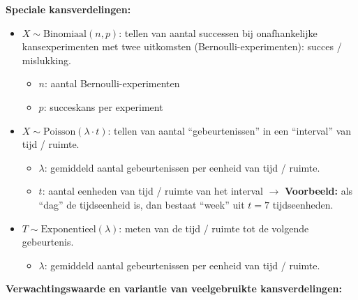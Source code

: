 \documentclass[11pt,a4paper,dutch]{article} %
\begin{document}
\textbf{Speciale kansverdelingen:}
\begin{itemize}
    \item $X \sim \text{Binomiaal}(n, p)$: tellen van aantal successen bij onafhankelijke kansexperimenten met twee uitkomsten (Bernoulli-experimenten): succes / mislukking.
    \begin{itemize}
        \item $n$: aantal Bernoulli-experimenten
        \item $p$: succeskans per experiment
    \end{itemize}
    \item $X \sim \text{Poisson}(\lambda \cdot t)$: tellen van aantal ``gebeurtenissen'' in een ``interval'' van tijd / ruimte.
    \begin{itemize}
        \item $\lambda$: gemiddeld aantal gebeurtenissen per eenheid van tijd / ruimte.  
        \item $t$: aantal eenheden van tijd / ruimte van het interval
        $\rightarrow$ \textbf{Voorbeeld:} als ``dag'' de tijdseenheid is, dan bestaat ``week'' uit $t=7$ tijdseenheden. 
    \end{itemize}
    \item $T \sim \text{Exponentieel}(\lambda)$: meten van de tijd / ruimte tot de volgende gebeurtenis.
    \begin{itemize}
        \item $\lambda$: gemiddeld aantal gebeurtenissen per eenheid van tijd / ruimte.  
    \end{itemize}
\end{itemize}
\newpage
\textbf{Verwachtingswaarde en variantie van veelgebruikte kansverdelingen:}
\end{document}

